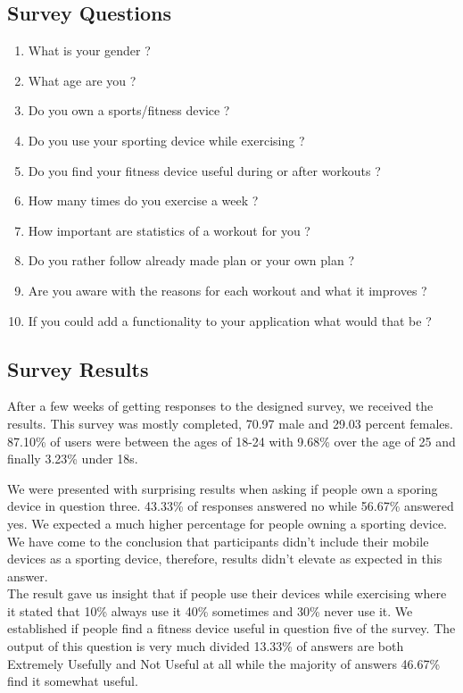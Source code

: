 \documentclass[a4paper,12pt]{report}
\begin{document}
\subsection{Survey Questions}

\begin{enumerate}
    \item What is your gender ?
    \item What age are you ? 
    \item Do you own a sports/fitness device ?
    \item Do you use your sporting device while exercising ?
    \item Do you find your fitness device useful during or after workouts ?
    \item How many times do you exercise a week ?
    \item How important are statistics of a workout for you ?
    \item Do you rather follow already made plan or your own plan ?
    \item Are you aware with the reasons for each workout and what it improves ?
    \item If you could add a functionality to your application what would that be ?
\end{enumerate}
\newpage
\subsection{Survey Results}

After a few weeks of getting responses to the designed survey, we received the results.
This survey was mostly completed, 70.97 male and 29.03 percent females.
87.10\% of users were between the ages of 18-24 with 9.68\% over the age of 25 and finally 3.23\% under 18s.

We were presented with surprising results when asking if people own a sporing device in question three.
43.33\% of responses answered no while 56.67\% answered yes. We expected a much higher percentage for people owning a sporting device. We have come to the conclusion that participants didn't include their mobile devices as a sporting device, therefore, results didn't elevate as expected in this answer.\\ 

The result gave us insight that if people use their devices while exercising where it stated that 10\% always use it 40\% sometimes and 30\% never use it.
We established if people find a fitness device useful in question five of the survey. The output of this question is very much divided 13.33\% of answers are both Extremely Usefully and Not Useful at all while the majority of answers 46.67\% find it somewhat useful.
\end{document}
